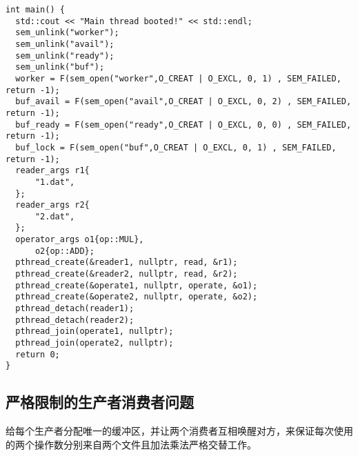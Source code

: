 \documentclass{ctexrep}
\begin{document}
\begin{verbatim}
int main() {
  std::cout << "Main thread booted!" << std::endl;
  sem_unlink("worker");
  sem_unlink("avail");
  sem_unlink("ready");
  sem_unlink("buf");
  worker = F(sem_open("worker",O_CREAT | O_EXCL, 0, 1) , SEM_FAILED, return -1);
  buf_avail = F(sem_open("avail",O_CREAT | O_EXCL, 0, 2) , SEM_FAILED, return -1);
  buf_ready = F(sem_open("ready",O_CREAT | O_EXCL, 0, 0) , SEM_FAILED, return -1);
  buf_lock = F(sem_open("buf",O_CREAT | O_EXCL, 0, 1) , SEM_FAILED, return -1);
  reader_args r1{
      "1.dat",
  };
  reader_args r2{
      "2.dat",
  };
  operator_args o1{op::MUL},
      o2{op::ADD};
  pthread_create(&reader1, nullptr, read, &r1);
  pthread_create(&reader2, nullptr, read, &r2);
  pthread_create(&operate1, nullptr, operate, &o1);
  pthread_create(&operate2, nullptr, operate, &o2);
  pthread_detach(reader1);
  pthread_detach(reader2);
  pthread_join(operate1, nullptr);
  pthread_join(operate2, nullptr);
  return 0;
}
\end{verbatim}

\subsection{严格限制的生产者消费者问题}

给每个生产者分配唯一的缓冲区，并让两个消费者互相唤醒对方，来保证每次使用的两个操作数分别来自两个文件且加法乘法严格交替工作。
\end{document}
